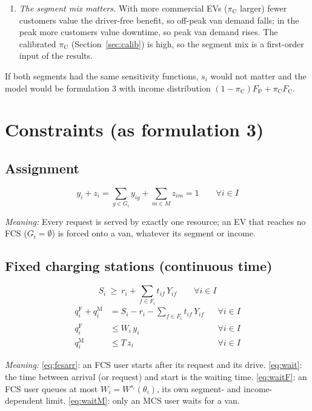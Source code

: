 \documentclass[12pt,a4paper]{article}
\newcommand{\mdesc}[1]{\par{\textit{Meaning:} #1}\par}
\begin{document}
\begin{enumerate}[itemsep=2pt]
  \item \emph{The segment mix matters.} With more commercial EVs ($\pi_{\mathrm C}$ larger) fewer customers value the driver-free benefit, so off-peak van demand falls; in the peak more customers value downtime, so peak van demand rises. The calibrated $\pi_{\mathrm C}$ (Section~\ref{sec:calib}) is high, so the segment mix is a first-order input of the results.
\end{enumerate}
If both segments had the same sensitivity functions, $s_i$ would not matter and the model would be formulation 3 with income distribution $(1-\pi_{\mathrm C})F_{\mathrm P}+\pi_{\mathrm C}F_{\mathrm C}$.

\section{Constraints (as formulation 3)}

\subsection{Assignment}
\begin{equation}
y_i+z_i=\sum_{g\in G_i}y_{ig}+\sum_{m\in M}z_{im}=1\qquad\forall i\in I \label{eq:assign}
\end{equation}
\mdesc{Every request is served by exactly one resource; an EV that reaches no FCS ($G_i=\emptyset$) is forced onto a van, whatever its segment or income.}

\subsection{Fixed charging stations (continuous time)}
\begin{equation}
S_i\ \ge\ r_i+\sum_{f\in F_i}t_{if}\,Y_{if}\qquad\forall i\in I \label{eq:fcsarr}
\end{equation}
\begin{align}
q^{\mathrm F}_i+q^{\mathrm M}_i &= S_i-r_i-\sum_{f\in F_i}t_{if}\,Y_{if} && \forall i\in I \label{eq:wait}\\
q^{\mathrm F}_i &\le W_i\,y_i && \forall i\in I \label{eq:waitF}\\
q^{\mathrm M}_i &\le T\,z_i && \forall i\in I \label{eq:waitM}
\end{align}
\mdesc{\eqref{eq:fcsarr}: an FCS user starts after its request and its drive. \eqref{eq:wait}: the time between arrival (or request) and start is the waiting time. \eqref{eq:waitF}: an FCS user queues at most $W_i=W^{s_i}(\theta_i)$, its own segment- and income-dependent limit. \eqref{eq:waitM}: only an MCS user waits for a van.}
\end{document}
